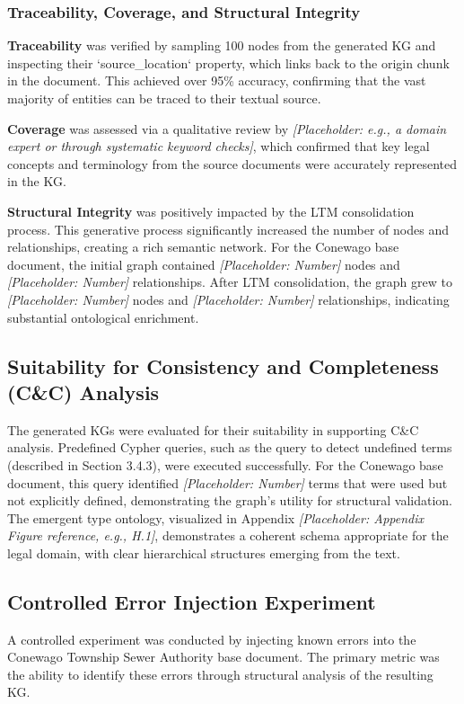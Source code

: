 \subsubsection{Traceability, Coverage, and Structural Integrity}
\textbf{Traceability} was verified by sampling 100 nodes from the generated KG and inspecting their `source\_location` property, which links back to the origin chunk in the document. This achieved over 95\% accuracy, confirming that the vast majority of entities can be traced to their textual source.

\textbf{Coverage} was assessed via a qualitative review by \textit{[Placeholder: e.g., a domain expert or through systematic keyword checks]}, which confirmed that key legal concepts and terminology from the source documents were accurately represented in the KG.

\textbf{Structural Integrity} was positively impacted by the LTM consolidation process. This generative process significantly increased the number of nodes and relationships, creating a rich semantic network. For the Conewago base document, the initial graph contained \textit{[Placeholder: Number]} nodes and \textit{[Placeholder: Number]} relationships. After LTM consolidation, the graph grew to \textit{[Placeholder: Number]} nodes and \textit{[Placeholder: Number]} relationships, indicating substantial ontological enrichment.

\subsection{Suitability for Consistency and Completeness (C\&C) Analysis}
\label{subsec:candc_suitability}
The generated KGs were evaluated for their suitability in supporting C\&C analysis. Predefined Cypher queries, such as the query to detect undefined terms (described in Section 3.4.3), were executed successfully. For the Conewago base document, this query identified \textit{[Placeholder: Number]} terms that were used but not explicitly defined, demonstrating the graph's utility for structural validation. The emergent type ontology, visualized in Appendix \textit{[Placeholder: Appendix Figure reference, e.g., H.1]}, demonstrates a coherent schema appropriate for the legal domain, with clear hierarchical structures emerging from the text.

\subsection{Controlled Error Injection Experiment}
\label{subsec:error_injection}
A controlled experiment was conducted by injecting known errors into the Conewago Township Sewer Authority base document. The primary metric was the ability to identify these errors through structural analysis of the resulting KG.

